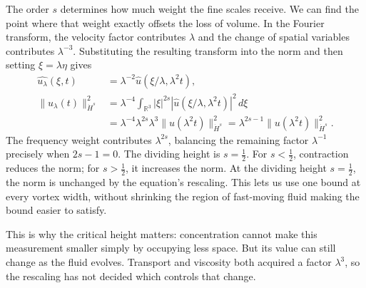 The order \(s\) determines how much weight the fine scales receive.
We can find the point where that weight exactly offsets the loss of
volume. In the Fourier transform, the velocity factor
contributes \(\lambda\) and the change of spatial variables contributes
\(\lambda^{-3}\). Substituting the resulting transform into the norm
and then setting \(\xi=\lambda\eta\) gives
\[
 \begin{aligned}
 \widehat{u_\lambda}(\xi,t)
 &=\lambda^{-2}\widehat u(\xi/\lambda,\lambda^2t),\\
 \|u_\lambda(t)\|_{\dot H^s}^2
 &=\lambda^{-4}\int_{\mathbb R^3}|\xi|^{2s}
      |\widehat u(\xi/\lambda,\lambda^2t)|^2\,d\xi\\
 &=\lambda^{-4}\lambda^{2s}\lambda^3
      \|u(\lambda^2t)\|_{\dot H^s}^2
 =\lambda^{2s-1}\|u(\lambda^2t)\|_{\dot H^s}^2.
 \end{aligned}
\]
The frequency weight contributes \(\lambda^{2s}\), balancing the
remaining factor \(\lambda^{-1}\) precisely when \(2s-1=0\).
The dividing height is \(s=\tfrac12\).
For \(s<\tfrac12\), contraction reduces the norm; for \(s>\tfrac12\),
it increases the norm. At the dividing height \(s=\tfrac12\), the norm is
unchanged by the equation's rescaling. This lets us use one bound at every
vortex width, without shrinking the region of fast-moving fluid making the
bound easier to satisfy.

This is why the critical height matters: concentration cannot make this
measurement smaller simply by occupying less space. But its value can
still change as the fluid evolves. Transport and viscosity both acquired
a factor \(\lambda^3\), so the rescaling has not decided which controls
that change.

